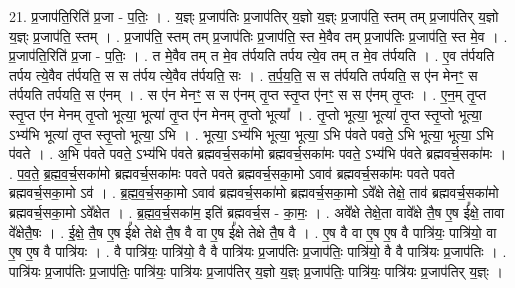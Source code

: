 \documentclass[17pt]{extarticle}
\begin{document}
21. प्र॒जाप॑ति॒रिति॑ प्र॒जा - प॒तिः॒ । . य॒ज्ञ्ः प्र॒जाप॑तिः प्र॒जाप॑तिर् य॒ज्ञो य॒ज्ञ्ः प्र॒जाप॑ति॒ स्तम् तम् प्र॒जाप॑तिर् य॒ज्ञो य॒ज्ञ्ः प्र॒जाप॑ति॒ स्तम् । . प्र॒जाप॑ति॒ स्तम् तम् प्र॒जाप॑तिः प्र॒जाप॑ति॒ स्त मे॒वैव तम् प्र॒जाप॑तिः प्र॒जाप॑ति॒ स्त मे॒व । . प्र॒जाप॑ति॒रिति॑ प्र॒जा - प॒तिः॒ । . त मे॒वैव तम् त मे॒व त॑र्पयति तर्पय त्ये॒व तम् त मे॒व त॑र्पयति । . ए॒व त॑र्पयति तर्पय त्ये॒वैव त॑र्पयति॒ स स त॑र्पय त्ये॒वैव त॑र्पयति॒ सः । . त॒र्प॒य॒ति॒ स स त॑र्पयति तर्पयति॒ स ए॑न मेनꣳ॒॒ स त॑र्पयति तर्पयति॒ स ए॑नम् । . स ए॑न मेनꣳ॒॒ स स ए॑नम् तृ॒प्त स्तृ॒प्त ए॑नꣳ॒॒ स स ए॑नम् तृ॒प्तः । . ए॒न॒म् तृ॒प्त स्तृ॒प्त ए॑न मेनम् तृ॒प्तो भूत्या॒ भूत्या॑ तृ॒प्त ए॑न मेनम् तृ॒प्तो भूत्या᳚ । . तृ॒प्तो भूत्या॒ भूत्या॑ तृ॒प्त स्तृ॒प्तो भूत्या॒ ऽभ्य॑भि भूत्या॑ तृ॒प्त स्तृ॒प्तो भूत्या॒ ऽभि । . भूत्या॒ ऽभ्य॑भि भूत्या॒ भूत्या॒ ऽभि प॑वते पवते॒ ऽभि भूत्या॒ भूत्या॒ ऽभि प॑वते । . अ॒भि प॑वते पवते॒ ऽभ्य॑भि प॑वते ब्रह्मवर्च॒सका॑मो ब्रह्मवर्च॒सका॑मः पवते॒ ऽभ्य॑भि प॑वते ब्रह्मवर्च॒सका॑मः । . प॒व॒ते॒ ब्र॒ह्म॒व॒र्च॒सका॑मो ब्रह्मवर्च॒सका॑मः पवते पवते ब्रह्मवर्च॒सका॒मो ऽवाव॑ ब्रह्मवर्च॒सका॑मः पवते पवते ब्रह्मवर्च॒सका॒मो ऽव॑ । . ब्र॒ह्म॒व॒र्च॒सका॒मो ऽवाव॑ ब्रह्मवर्च॒सका॑मो ब्रह्मवर्च॒सका॒मो ऽवे᳚क्षे तेक्षे॒ ताव॑ ब्रह्मवर्च॒सका॑मो ब्रह्मवर्च॒सका॒मो ऽवे᳚क्षेत । . ब्र॒ह्म॒व॒र्च॒सका॑म॒ इति॑ ब्रह्मवर्च॒स - का॒मः॒ । . अवे᳚क्षे तेक्षे॒ता वावे᳚क्षे तै॒ष ए॒ष ई᳚क्षे॒ तावा वे᳚क्षेतै॒षः । . ई॒क्षे॒ तै॒ष ए॒ष ई᳚क्षे तेक्षे तै॒ष वै वा ए॒ष ई᳚क्षे तेक्षे तै॒ष वै । . ए॒ष वै वा ए॒ष ए॒ष वै पात्रि॑यः॒ पात्रि॑यो॒ वा ए॒ष ए॒ष वै पात्रि॑यः । . वै पात्रि॑यः॒ पात्रि॑यो॒ वै वै पात्रि॑यः प्र॒जाप॑तिः प्र॒जाप॑तिः॒ पात्रि॑यो॒ वै वै पात्रि॑यः प्र॒जाप॑तिः । . पात्रि॑यः प्र॒जाप॑तिः प्र॒जाप॑तिः॒ पात्रि॑यः॒ पात्रि॑यः प्र॒जाप॑तिर् य॒ज्ञो य॒ज्ञ्ः प्र॒जाप॑तिः॒ पात्रि॑यः॒ पात्रि॑यः प्र॒जाप॑तिर् य॒ज्ञ्ः । \newline
\end{document}
